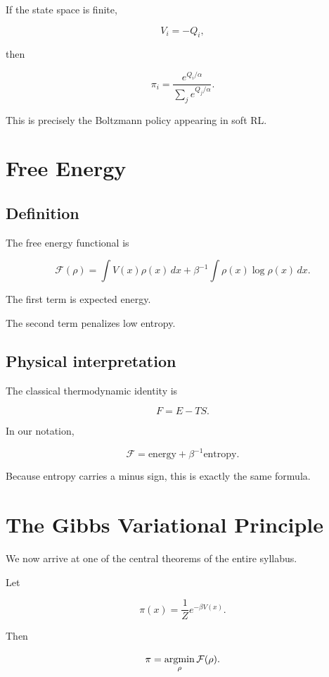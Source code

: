 If the state space is finite,

\[
V_i=-Q_i,
\]

then

\[
\pi_i
=
\frac{e^{Q_i/\alpha}}
{\sum_j e^{Q_j/\alpha}}.
\]

This is precisely the Boltzmann policy appearing in soft RL.

\section{Free Energy}

\subsection{Definition}

\begin{definition}

The free energy functional is

\[
\mathcal F(\rho)
=
\int V(x)\rho(x)\,dx
+
\beta^{-1}
\int
\rho(x)\log\rho(x)\,dx.
\]

The first term is expected energy.

The second term penalizes low entropy.
\end{definition}

\subsection{Physical interpretation}

The classical thermodynamic identity is

\[
F=E-TS.
\]

In our notation,

\[
\mathcal F
=
\text{energy}
+
\beta^{-1}
\text{entropy}.
\]

Because entropy carries a minus sign,
this is exactly the same formula.

\section{The Gibbs Variational Principle}

We now arrive at one of the central theorems of the entire syllabus.

\begin{theorem}

Let

\[
\pi(x)
=
\frac1Z e^{-\beta V(x)}.
\]

Then

\[
\pi
=
\operatorname*{argmin}_{\rho}
\mathcal F(\rho).
\]

\end{theorem}

